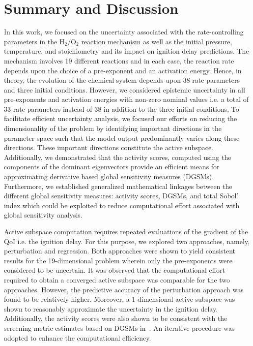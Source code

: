 \section{Summary and Discussion}
\label{sec:conc}
 
In this work, we focused on the uncertainty associated with the
rate-controlling parameters in the H$_2$/O$_2$ reaction mechanism
as well as the initial pressure, temperature, and stoichiometry and its
impact on ignition delay predictions. The mechanism involves 19 different
reactions and in each case, the reaction rate depends upon the choice of a
pre-exponent and an activation energy. Hence, in theory, the evolution of the
chemical system depends upon 38 rate parameters and three initial conditions.
However, we considered 
epistemic uncertainty in all pre-exponents and activation energies with non-zero
nominal values i.e. a total of 33 rate parameters instead of 38 in addition to
the three initial conditions.  
To facilitate efficient uncertainty analysis, we focused our efforts on
reducing the dimensionality of the problem by identifying important directions
in the parameter space such that the model output 
predominantly varies along these directions. These important directions
constitute the active subspace. Additionally, we demonstrated that the activity scores,
computed using the components of the dominant eigenvectors provide an efficient
means for approximating derivative based global sensitivity measures (DGSMs).
Furthermore, we established generalized mathematical linkages between the
different global sensitivity measures: activity scores, DGSMs, and total Sobol'
index which could be exploited to reduce computational effort associated with
global sensitivity analysis. 
 
Active subspace computation requires repeated evaluations of the gradient of
the QoI i.e. the ignition delay. For this purpose, we explored two approaches,
namely, perturbation and regression. Both approaches were shown to yield
consistent results for the 19-dimensional problem wherein only the
pre-exponents were considered to be uncertain. It was observed that the
computational effort required to obtain a converged active subspace was
comparable for the two approaches. However, the predictive accuracy of the
perturbation approach was found to be relatively higher. Moreover, a
1-dimensional active subspace was shown to reasonably approximate the
uncertainty in the ignition delay. Additionally, the activity scores were also
shown to be consistent with the screening metric estimates based on DGSMs
in~\cite{Vohra:2018}. An iterative procedure was adopted to enhance the
computational efficiency. 

